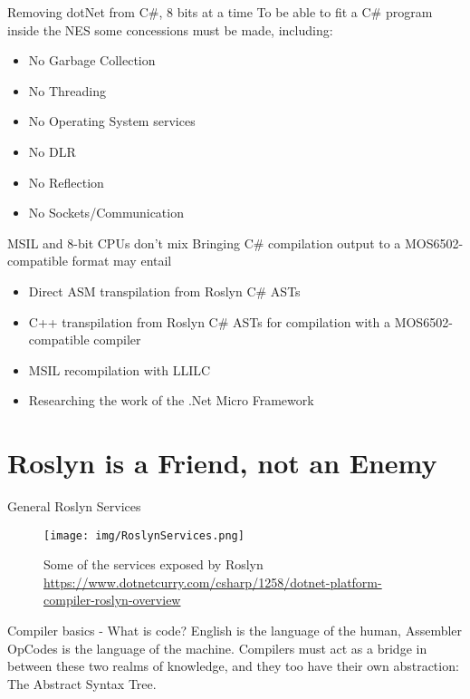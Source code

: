 \documentclass[10pt]{beamer}
\begin{document}
\begin{frame}{Removing dotNet from C\#, 8 bits at a time}
To be able to fit a C\# program inside the NES some concessions must be made, including:
\begin{itemize}
	\item No Garbage Collection
	\item No Threading
	\item No Operating System services
	\item No DLR
	\item No Reflection
	\item No Sockets/Communication
\end{itemize}
\end{frame}

\begin{frame}{MSIL and 8-bit CPUs don't mix}
Bringing C\# compilation output to a MOS6502-compatible format may entail
\begin{itemize}
	\item Direct ASM transpilation from Roslyn C\# ASTs
	\item C++ transpilation from Roslyn C\# ASTs for compilation with a MOS6502-compatible compiler
	\item MSIL recompilation with LLILC
	\item Researching the work of the .Net Micro Framework
\end{itemize}
\end{frame}

\section{Roslyn is a Friend, not an Enemy}
\begin{frame}{General Roslyn Services}
    \begin{figure}
        \center
        \texttt{[image: img/RoslynServices.png]}
        \caption{Some of the services exposed by Roslyn \\ \tiny{\href{Taken from DotNetCurry}{https://www.dotnetcurry.com/csharp/1258/dotnet-platform-compiler-roslyn-overview}}}
    \end{figure}
\end{frame}

\begin{frame}{Compiler basics - What is code?}
English is the language of the human, Assembler OpCodes is the language of the machine. Compilers must act as a bridge in between these two realms of knowledge, and they too have their own abstraction: The Abstract Syntax Tree.
\end{frame}
\end{document}
